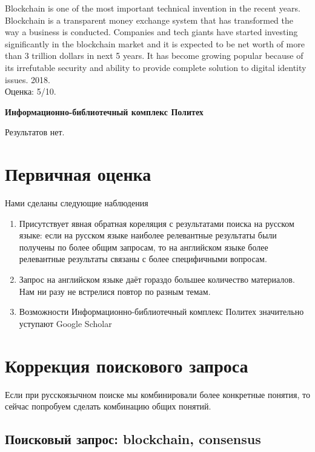 \documentclass[a4paper, 12pt]{report}		%
\begin{document}
\begin{enumerate}
Blockchain is one of the most important technical invention in the recent years. Blockchain is a transparent money exchange system that has transformed the way a business is conducted. Companies and tech giants have started investing significantly in the blockchain market and it is expected to be net worth of more than 3 trillion dollars in next 5 years. It has become growing popular because of its irrefutable security and ability to provide complete solution to digital identity issues. 2018.\\
Оценка: 5/10.
\end{enumerate}

\textbf{Информационно-библиотечный комплекс Политех}

Результатов нет.

\section*{Первичная оценка}

Нами сделаны следующие наблюдения

\begin{enumerate}
\item Присутствует явная обратная кореляция с результатами поиска на русском языке: если на русском языке наиболее релевантные результаты были получены по более общим запросам, то на английском языке более релевантные результаты связаны с более специфичными вопросам.
\item Запрос на английском языке даёт гораздо большее количество материалов. Нам ни разу не встрелися повтор по разным темам.
\item Возможности Информационно-библиотечный комплекс Политех значительно уступают Google Scholar
\end{enumerate}

\section*{Коррекция поискового запроса}

Если при русскоязычном поиске мы комбинировали более конкретные понятия, то сейчас попробуем сделать комбинацию общих понятий.

\subsection*{Поисковый запрос: blockchain, consensus}
\end{document}
